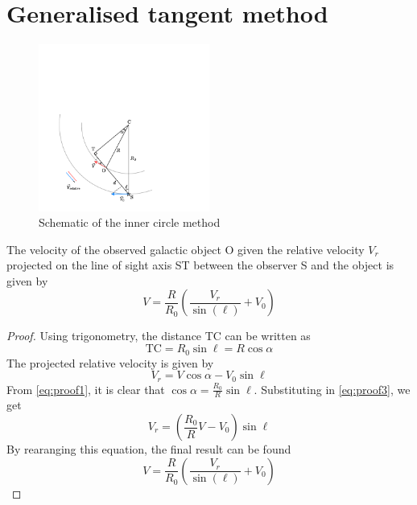 \section{Generalised tangent method}
\label{sec:proof_generalised_tangent}
\begin{figure}[htbp]
    \centering
    \includegraphics[width=0.5\textwidth]{figures/inner_circle_method.pdf}
    \caption{Schematic of the inner circle method}
    \label{fig:inner_circle_method}
\end{figure}
%
The velocity of the observed galactic object O given the relative velocity $V_r$ projected on the line of sight axis ST between the observer S and the object is given by
\begin{equation}
    V = \frac{R}{R_0} \left( \frac{V_r}{\sin(\ell)} + V_0 \right)
\end{equation}
\begin{proof}
    Using trigonometry, the distance TC can be written as
    \begin{equation}
       \textrm{TC} = R_0 \sin\ell = R \cos\alpha
       \label{eq:proof1}
    \end{equation}
    The projected relative velocity is given by
    \begin{equation}
        V_r = V \cos\alpha - V_0 \sin\ell
       \label{eq:proof3}
    \end{equation}
    From \autoref{eq:proof1}, it is clear that $\cos\alpha = \frac{R_0}{R} \sin\ell$. Substituting in \autoref{eq:proof3}, we get
    \begin{equation}
        V_r = \left( \frac{R_0}{R} V - V_0 \right) \sin\ell
    \end{equation}
    By rearanging this equation, the final result can be found
    \begin{equation}
        V = \frac{R}{R_0} \left( \frac{V_r}{\sin(\ell)} + V_0 \right)
    \end{equation}
\end{proof}

